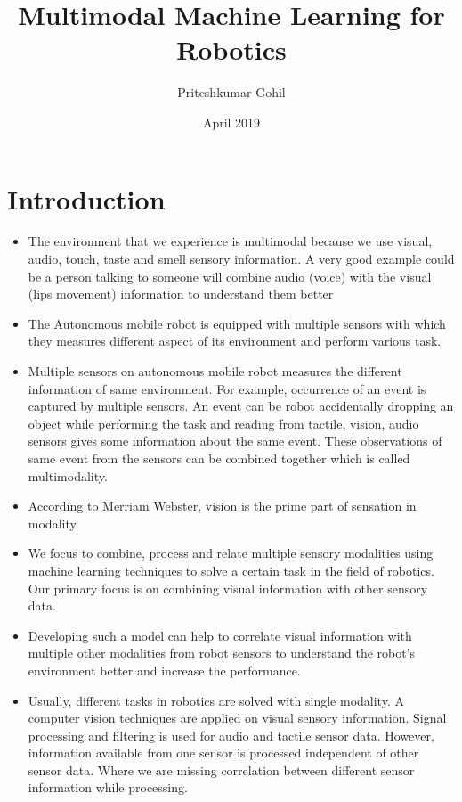 \documentclass[rnd]{mas_proposal}
\title{Multimodal Machine Learning for Robotics}
\author{Priteshkumar Gohil}
\date{April 2019}
\begin{document}
\maketitle

\pagestyle{plain}

\chapter{Introduction}
\begin{itemize}
    \item The environment that we experience is multimodal because we use visual, audio, touch, taste and smell sensory information. A very good example could be a person talking to someone will combine audio (voice) with the visual (lips movement) information to understand them better
    \item The Autonomous mobile robot is equipped with multiple sensors with which they measures different aspect of its environment and perform various task. 
    \item Multiple sensors on autonomous mobile robot measures the different information of same environment. For example, occurrence of an event is captured by multiple sensors. An event can be robot accidentally dropping an object while performing the task and reading from tactile, vision, audio sensors gives some information about the same event. These observations of same event from the sensors can be combined together which is called multimodality.
    \item According to Merriam Webster, vision is the prime part of sensation in modality.
    \item We focus to combine, process and relate multiple sensory modalities using machine learning techniques to solve a certain task in the field of robotics. Our primary focus is on combining visual information with other sensory data.
    \item Developing such a model can help to correlate visual information with multiple other modalities from robot sensors to understand the robot's environment better and increase the performance.
    \item Usually, different tasks in robotics are solved with single modality. A computer vision techniques are applied on visual sensory information. Signal processing and filtering is used for audio and tactile sensor data. However, information available from one sensor is processed independent of other sensor data. Where we are missing correlation between different sensor information while processing.

\end{itemize}
\end{document}
